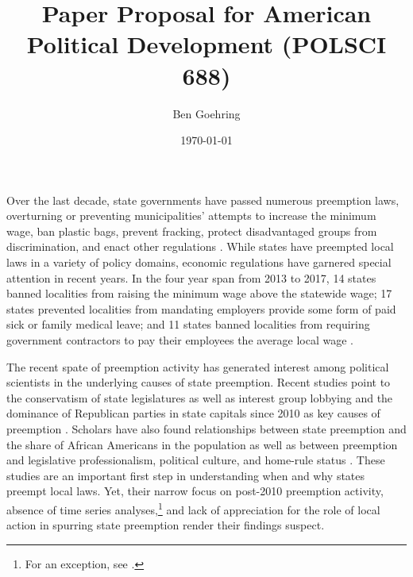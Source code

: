 \documentclass[12pt]{article}
\title{Paper Proposal for American Political Development (POLSCI 688)}
\author{Ben Goehring}
\date{\today}
\begin{document}
\begin{titlepage}
\maketitle
\end{titlepage}
\hypersetup{pageanchor=false}


Over the last decade, state governments have passed numerous preemption laws, overturning or preventing municipalities' attempts to increase the minimum wage, ban plastic bags, prevent fracking, protect disadvantaged groups from discrimination, and enact other regulations \parencite{dupuisCityRightsEra2018,schraggerStatePreemptionLocal2017}. While states have preempted local laws in a variety of policy domains, economic regulations have garnered special attention in recent years. In the four year span from 2013 to 2017, 14 states banned localities from raising the minimum wage above the statewide wage; 17 states prevented localities from mandating employers provide some form of paid sick or family medical leave; and 11 states banned localities from requiring government contractors to pay their employees the average local wage \parencite{vonwilpertCityGovernmentsAre2017}.

The recent spate of preemption activity has generated interest among political scientists in the underlying causes of state preemption. Recent studies point to the conservatism of state legislatures \parencite{goodmanStateLegislativeIdeology2019} as well as interest group lobbying and the dominance of Republican parties in state capitals since 2010 as key causes of preemption \parencite{hicksHomeRuleBe2018,fowlerStatePreemptionLocal2019,flavinExplainingStatePreemption2019,riverstone-newellRiseStatePreemption2017}. Scholars have also found relationships between state preemption and the share of African Americans in the population \parencite{flavinExplainingStatePreemption2019} as well as between preemption and legislative professionalism, political culture, and home-rule status \parencite{fowlerStatePreemptionLocal2019}. These studies are an important first step in understanding when and why states preempt local laws. Yet, their narrow focus on post-2010 preemption activity, absence of time series analyses,\footnote{For an exception, see \textcite{goodmanStateLegislativeIdeology2019}.} and lack of appreciation for the role of local action in spurring state preemption render their findings suspect.
\end{document}
